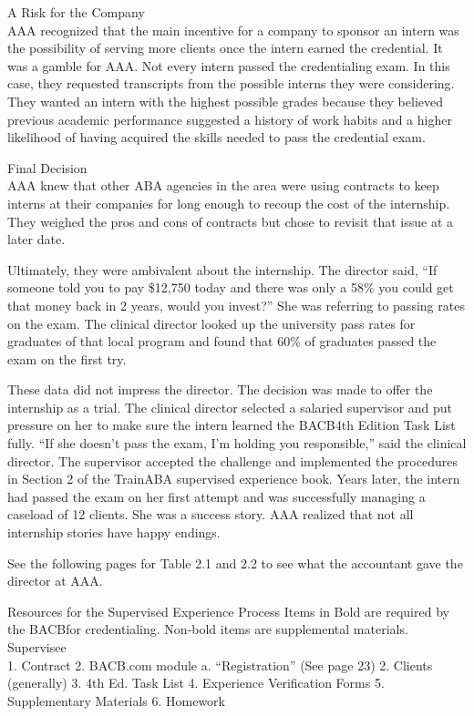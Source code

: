 A Risk for the Company\\
AAA recognized that the main incentive for a company to sponsor an intern was the possibility of serving more clients once the intern earned the credential. It was a gamble for AAA. Not every intern passed the credentialing exam. In this case, they requested transcripts from the possible interns they were considering. They wanted an intern with the highest possible grades because they believed previous academic performance suggested a history of work habits and a higher likelihood of having acquired the skills needed to pass the credential exam.

Final Decision\\
AAA knew that other ABA agencies in the area were using contracts to keep interns at their companies for long enough to recoup the cost of the internship. They weighed the pros and cons of contracts but chose to revisit that issue at a later date.

Ultimately, they were ambivalent about the internship. The director said, ``If someone told you to pay \$12,750 today and there was only a 58\% you could get that money back in 2 years, would you invest?'' She was referring to passing rates on the exam. The clinical director looked up the university pass rates for graduates of that local program and found that 60\% of graduates passed the exam on the first try. 

These data did not impress the director. The decision was made to offer the internship as a trial. The clinical director selected a salaried supervisor and put pressure on her to make sure the intern learned the BACB\textregistered 4th Edition Task List fully. ``If she doesn't pass the exam, I'm holding you responsible,'' said the clinical director. The supervisor accepted the challenge and implemented the procedures in Section 2 of the TrainABA supervised experience book. Years later, the intern had passed the exam on her first attempt and was successfully managing a caseload of 12 clients. She was a success story. AAA realized that not all internship stories have happy endings.

See the following pages for Table 2.1 and 2.2 to see what the accountant gave the director at AAA.


Resources for the Supervised Experience Process 
Items in Bold are required by the BACB\textregistered for credentialing. Non-bold items are supplemental materials. \\

Supervisee\\
    1. Contract
    2. BACB.com module
        a. ``Registration'' (See page 23)
    2. Clients (generally)
    3. 4th Ed. Task List
    4. Experience Verification Forms
    5. Supplementary Materials
    6. Homework



